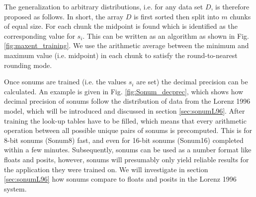 The generalization to arbitrary distributions, i.e. for any data set $D$, is therefore proposed as follows. In short, the array $D$ is first sorted then split into $m$ chunks of equal size. For each chunk the midpoint is found which is identified as the corresponding value for $s_i$. This can be written as an algorithm as shown in Fig. \ref{fig:maxent_training}. We use the arithmetic average between the minimum and maximum value (i.e. midpoint) in each chunk to satisfy the round-to-nearest rounding mode.

%
%
%
%
%
%

Once sonums are trained (i.e. the values $s_i$ are set) the decimal precision can be calculated. An example is given in Fig. \ref{fig:Sonum_decprec}, which shows how decimal precision of sonums follow the distribution of data from the Lorenz 1996 model, which will be introduced and discussed in section \ref{sec:sonumL96}. After training the look-up tables have to be filled, which means that every arithmetic operation between all possible unique pairs of sonums is precomputed. This is for 8-bit sonums (Sonum8) fast, and even for 16-bit sonums (Sonum16) completed within a few minutes. Subsequently, sonums can be used as a number format like floats and posits, however, sonums will presumably only yield reliable results for the application they were trained on. We will investigate in section \ref{sec:sonumL96} how sonums compare to floats and posits in the Lorenz 1996 system.

